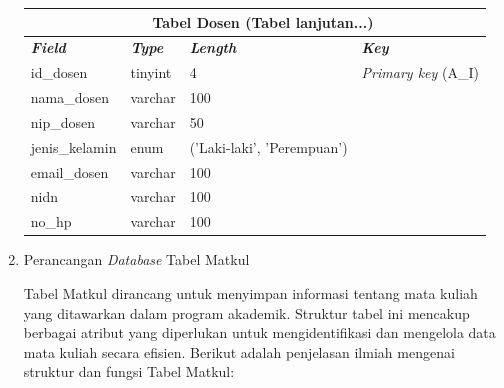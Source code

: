 \begin{enumerate}
{\begin{longtable}{l l l l}
				      \multicolumn{4}{c}{\tablename\ \thetable\ {Tabel Dosen} \space (Tabel lanjutan...)}                         \\
				      \hline
				      \textbf{\textit{Field}} & \textbf{\textit{Type}} & \textbf{\textit{Length}}   & \textbf{\textit{Key}}       \\
				      \hline
				      \endhead

				      id\_dosen               & tinyint                & 4                          & \textit{Primary key} (A\_I) \\
				      nama\_dosen             & varchar                & 100                        &                             \\
				      nip\_dosen              & varchar                & 50                         &                             \\
				      jenis\_kelamin          & enum                   & ('Laki-laki', 'Perempuan') &                             \\
				      email\_dosen            & varchar                & 100                        &                             \\
				      nidn                    & varchar                & 100                        &                             \\
				      no\_hp                  & varchar                & 100                        &                             \\
				      \hline
			      \end{longtable}
		      }

	\item Perancangan \textit{Database} Tabel Matkul

	      Tabel Matkul dirancang untuk menyimpan informasi tentang mata kuliah yang ditawarkan dalam program akademik. Struktur tabel ini mencakup berbagai atribut yang diperlukan untuk mengidentifikasi dan mengelola data mata kuliah secara efisien. Berikut adalah penjelasan ilmiah mengenai struktur dan fungsi Tabel Matkul:


\end{enumerate}
